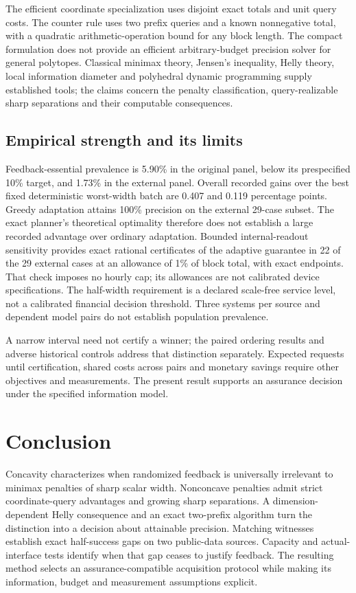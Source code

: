 The efficient coordinate specialization uses disjoint exact totals and
unit query costs. The counter rule uses two prefix queries and a known
nonnegative total, with a quadratic arithmetic-operation bound for any
block length. The compact formulation does not provide an efficient
arbitrary-budget precision solver for general polytopes. Classical
minimax theory, Jensen's inequality, Helly theory, local information
diameter and polyhedral dynamic programming supply established tools;
the claims concern the penalty classification, query-realizable sharp
separations and their computable consequences.

\subsection{Empirical strength and its limits}
Feedback-essential prevalence is 5.90\% in the original panel, below its
prespecified 10\% target, and 1.73\% in the external panel. Overall
recorded gains over the best fixed deterministic worst-width batch are
0.407 and 0.119 percentage points. Greedy adaptation attains 100\%
precision on the external 29-case subset. The exact planner's theoretical
optimality therefore does not establish a large recorded advantage over
ordinary adaptation. Bounded internal-readout sensitivity provides exact rational certificates of the adaptive guarantee
in 22 of the 29 external cases at an allowance of 1\% of
block total, with exact endpoints. That check imposes no hourly cap; its
allowances are not calibrated device specifications. The half-width requirement is a declared scale-free
service level, not a calibrated financial decision threshold. Three
systems per source and dependent model pairs do not establish population
prevalence.

A narrow interval need not certify a winner; the paired ordering results
and adverse historical controls address that distinction separately.
Expected requests until certification, shared costs across pairs and
monetary savings require other objectives and measurements. The present
result supports an assurance decision under the specified information model.

\section{Conclusion}
Concavity characterizes when randomized feedback is universally irrelevant
to minimax penalties of sharp scalar width. Nonconcave penalties admit
strict coordinate-query advantages and growing sharp separations.
A dimension-dependent Helly consequence and an exact two-prefix algorithm
turn the distinction into a decision about attainable precision.
Matching witnesses establish exact half-success gaps on two public-data
sources. Capacity and actual-interface tests identify when that gap ceases
to justify feedback. The resulting method selects an assurance-compatible
acquisition protocol while making its information, budget and measurement
assumptions explicit.
